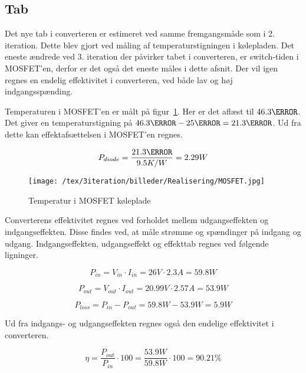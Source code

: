 
\subsection{Tab}
Det nye tab i converteren er estimeret ved samme fremgangsmåde som i 2. iteration. Dette blev gjort ved måling af temperaturstigningen i kølepladen. Det eneste ændrede ved 3. iteration der påvirker tabet i converteren, er switch-tiden i MOSFET'en, derfor er det også det eneste måles i dette afsnit. Der vil igen regnes en endelig effektivitet i converteren, ved både lav og høj indgangsspænding. 

Temperaturen i MOSFET'en er målt på figur~\ref{fig:mosfet_tab_3}. Her er det aflæst til $46.3\degreeCelsius$. Det giver en temperaturstigning på $46.3\degreeCelsius - 25\degreeCelsius = 21.3\degreeCelsius$. Ud fra dette kan effektafsættelsen i MOSFET'en regnes.

\begin{equation}
P_{diode} = \frac{21.3\degreeCelsius}{9.5K/W} = 2.29W
\end{equation}


\begin{figure}[H]
	\center
	\texttt{[image: /tex/3iteration/billeder/Realisering/MOSFET.jpg]}
	\caption{Temperatur i MOSFET køleplade}
	\label{fig:mosfet_tab_3}
\end{figure}

Converterens effektivitet regnes ved forholdet mellem udgangseffekten og indgangseffekten. Disse findes ved, at måle strømme og spændinger på indgang og udgang. Indgangseffekten, udgangseffekt og effekttab regnes ved følgende ligninger.

\begin{equation}
P_{in} = V_{in} \cdot I_{in} = 26V \cdot 2.3A = 59.8W
\end{equation}

\begin{equation}
P_{out} = V_{out} \cdot I_{out} = 20.99V \cdot 2.57A = 53.9W
\end{equation}

\begin{equation}
P_{loss} = P_{in} - P_{out} = 59.8W - 53.9W = 5.9W
\end{equation}

\noindent Ud fra indgangs- og udgangseffekten regnes også den endelige effektivitet i converteren. 

\begin{equation}
\eta = \frac{P_{out}}{P_{in}} \cdot 100 = \frac{53.9W}{59.8W} \cdot 100 = 90.21\percent
\end{equation}

